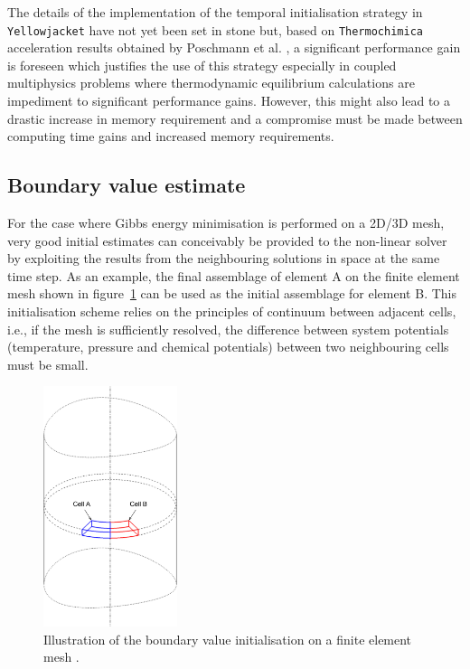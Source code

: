 	The details of the implementation of the temporal initialisation strategy in \texttt{Yellowjacket} have not yet been set in stone but, based on \texttt{Thermochimica} acceleration results obtained by Poschmann et al. \cite{Poschmann:2019aa} , a significant performance gain is foreseen which justifies the use of this strategy especially in coupled multiphysics problems where thermodynamic equilibrium calculations are impediment to significant performance gains. However, this might also lead to a drastic increase in memory requirement and a compromise must be made between  computing time gains and increased memory requirements.

	\subsection{Boundary value estimate}
	For the case where Gibbs energy minimisation is performed on a 2D/3D mesh, very good initial estimates can conceivably be provided to the non-linear solver by exploiting the results from the neighbouring solutions in space at the same time step. As an example, the final assemblage of element A on the finite element mesh shown in figure~\ref{fig:BV_Illustration} can be used as the initial assemblage for element B. This initialisation scheme relies on the principles of continuum between adjacent cells, i.e., if the mesh is sufficiently resolved, the difference between system potentials (temperature, pressure and chemical potentials) between two neighbouring cells must be small.
	\begin{figure}[htbp]
		\centering
		\includegraphics[width=0.35\textwidth]{figures/BV_FEM}
		\caption{Illustration of the boundary value initialisation on a finite element mesh \cite{Piro17}.}
		\label{fig:BV_Illustration}
	\end{figure}

